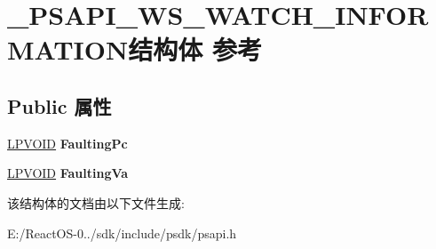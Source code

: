 \hypertarget{struct___p_s_a_p_i___w_s___w_a_t_c_h___i_n_f_o_r_m_a_t_i_o_n}{}\section{\+\_\+\+P\+S\+A\+P\+I\+\_\+\+W\+S\+\_\+\+W\+A\+T\+C\+H\+\_\+\+I\+N\+F\+O\+R\+M\+A\+T\+I\+O\+N结构体 参考}
\label{struct___p_s_a_p_i___w_s___w_a_t_c_h___i_n_f_o_r_m_a_t_i_o_n}
\subsection*{Public 属性}
\begin{DoxyCompactItemize}
\item 
\mbox{\label{struct___p_s_a_p_i___w_s___w_a_t_c_h___i_n_f_o_r_m_a_t_i_o_n_a7c88d8b1c740dcc4ca3128231dbeabb9}} 
\hyperlink{interfacevoid}{L\+P\+V\+O\+ID} {\bfseries Faulting\+Pc}
\item 
\mbox{\label{struct___p_s_a_p_i___w_s___w_a_t_c_h___i_n_f_o_r_m_a_t_i_o_n_a494e417637672ed774f01019d2e0bb41}} 
\hyperlink{interfacevoid}{L\+P\+V\+O\+ID} {\bfseries Faulting\+Va}
\end{DoxyCompactItemize}


该结构体的文档由以下文件生成\+:\begin{DoxyCompactItemize}
\item 
E\+:/\+React\+O\+S-\/0../sdk/include/psdk/psapi.\+h\end{DoxyCompactItemize}
